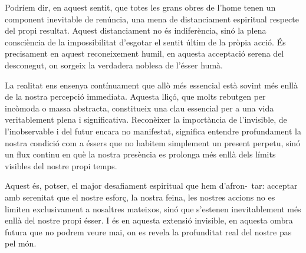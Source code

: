 Podríem dir, en aquest sentit, que totes les grans obres de l’home tenen un component inevitable de renúncia, una mena de distanciament espiritual respecte del propi resultat. Aquest distanciament no és indiferència, sinó la plena consciència de la impossibilitat d'esgotar el sentit últim de la pròpia acció. És precisament en aquest reconeixement humil, en aquesta acceptació serena del desconegut, on sorgeix la verdadera noblesa de l'ésser humà.

La realitat ens ensenya contínuament que allò més essencial està sovint més enllà de la nostra percepció immediata. Aquesta lliçó, que molts rebutgen per incòmoda o massa abstracta, constitueix una clau essencial per a una vida veritablement plena i significativa. Reconèixer la importància de l'invisible, de l'inobservable i del futur encara no manifestat, significa entendre profundament la nostra condició com a éssers que no habitem simplement un present perpetu, sinó un flux continu en què la nostra presència es prolonga més enllà dels límits visibles del nostre propi temps.

Aquest és, potser, el major desafiament espiritual que hem d'afron-\ tar: acceptar amb serenitat que el nostre esforç, la nostra feina, les nostres accions no es limiten exclusivament a nosaltres mateixos, sinó que s'estenen inevitablement més enllà del nostre propi ésser. I és en aquesta extensió invisible, en aquesta ombra futura que no podrem veure mai, on es revela la profunditat real del nostre pas pel món.